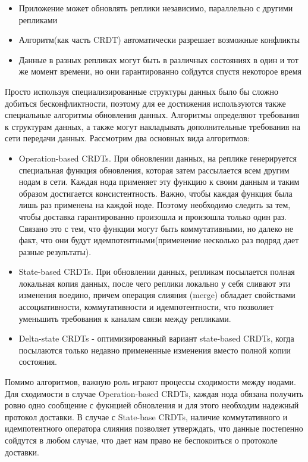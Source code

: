 \begin{itemize}
    \item Приложение может обновлять реплики независимо, параллельно с другими репликами
    \item Алгоритм(как часть CRDT) автоматически разрешает возможные конфликты
    \item Данные в разных репликах могут быть в различных состояниях в один и тот же момент времени, но они гарантированно сойдутся спустя некоторое время 
\end{itemize}
Просто используя специализированные структуры данных было бы сложно добиться бесконфликтности, поэтому для ее достижения используются также специальные алгоритмы обновления данных. Алгоритмы определяют требования к структурам данных, а также могут накладывать дополнительные требования на сети передачи данных. Рассмотрим два основных вида алгоритмов:
\begin{itemize}
    \item Operation-based CRDTs. При обновлении данных, на реплике генерируется специальная функция обновления, которая затем рассылается всем другим нодам в сети. Каждая нода применяет эту функцию к своим данным и таким образом достигается консистентность. Важно, чтобы каждая функция была лишь раз применена на каждой ноде. Поэтому необходимо следить за тем, чтобы доставка гарантированно произошла и произошла только один раз. Связано это с тем, что функции могут быть коммутативными, но далеко не факт, что они будут идемпотентными(применение несколько раз подряд дает разные результаты).
    \item State-based CRDTs. При обновлении данных, репликам посылается полная локальная копия данных, после чего реплики локально у себя сливают эти изменения воедино, причем операция слияния (merge) обладает свойствами ассоциативности, коммутативности и идемпотентности, что позволяет уменьшить требования к каналам связи между репликами. 
    \item Delta-state CRDTs - оптимизированный вариант state-based CRDTs, когда посылаются только недавно примененные изменения вместо полной копии состояния.
\end{itemize}
Помимо алгоритмов, важную роль играют процессы сходимости между нодами. Для сходимости в случае Operation-based CRDTs, каждая нода обязана получить ровно одно сообщение с фукнцией обновления и для этого необходим надежный протокол доставки. В случае с State-base CRDTs, наличие коммутативного и идемпотентного оператора слияния позволяет утверждать, что данные постепенно сойдутся в любом случае, что дает нам право не беспокоиться о протоколе доставки. 
